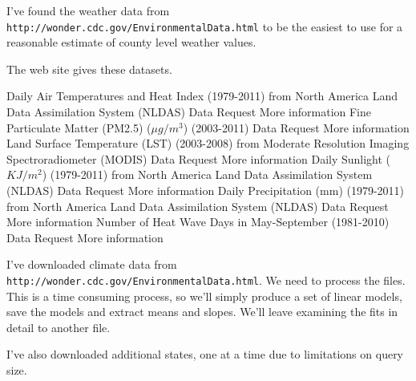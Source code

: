 \documentclass{report}
\begin{document}
I've found the weather data from \verb|http://wonder.cdc.gov/EnvironmentalData.html| to be the easiest to use for a reasonable estimate of county level weather values.

The web site gives these datasets.

Daily Air Temperatures and Heat Index (1979-2011) from North America Land Data Assimilation System (NLDAS) 
Data Request More information
Fine Particulate Matter (PM2.5) ($\mu g/m^3$) (2003-2011) 
Data Request More information
Land Surface Temperature (LST) (2003-2008) from Moderate Resolution Imaging Spectroradiometer (MODIS) 
Data Request More information
Daily Sunlight ($KJ/m^2$) (1979-2011) from North America Land Data Assimilation System (NLDAS) 
Data Request More information
Daily Precipitation (mm) (1979-2011) from North America Land Data Assimilation System (NLDAS) 
Data Request More information
Number of Heat Wave Days in May-September (1981-2010) 
Data Request More information


I've downloaded climate data from \verb|http://wonder.cdc.gov/EnvironmentalData.html|. We need to process the files. This is a time consuming process, so we'll simply produce a set of linear models, save the models and extract means and slopes. We'll leave examining the fits in detail to another file.

I've also downloaded additional states, one at a time due to limitations on query size. 

\begin{Schunk}
\end{Schunk}
\end{document}
